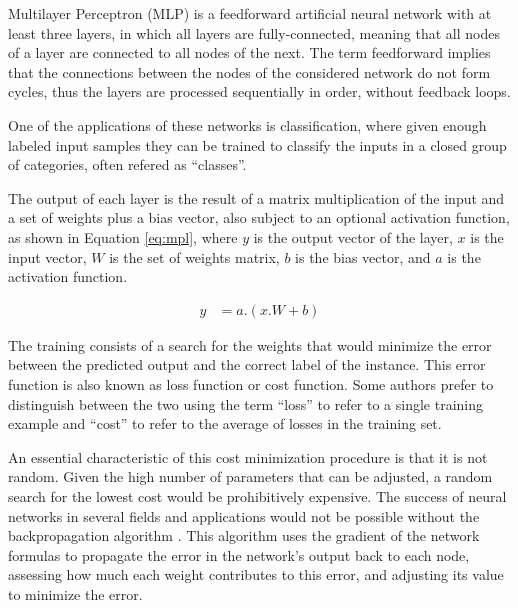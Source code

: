 Multilayer Perceptron (MLP) \cite{rosenblatt_perceptron:_1958} is a feedforward artificial neural network with at least three layers, in which all layers are fully-connected, meaning that all nodes of a layer are connected to all nodes of the next. The term feedforward implies that the connections between the nodes of the considered network do not form cycles, thus the layers are processed sequentially in order, without feedback loops.

One of the applications of these networks is classification, where given enough labeled input samples they can be trained to classify the inputs in a closed group of categories, often refered as ``classes''.

The output of each layer is the result of a matrix multiplication of the input and a set of weights plus a bias vector, also subject to an optional activation function, as shown in Equation \ref{eq:mpl}, where $y$ is the output vector of the layer, $x$ is the input vector, $W$ is the set of weights matrix, $b$ is the bias vector, and $a$ is the activation function.

\begin{align}
\label{eq:mpl}     
y &= a.(x.W + b)
\end{align}

The training consists of a search for the weights that would minimize the error between the predicted output and the correct label of the instance. This error function is also known as loss function or cost function. Some authors prefer to distinguish between the two using the term ``loss'' to refer to a single training example and ``cost'' to refer to the average of losses in the training set.


An essential characteristic of this cost minimization procedure is that it is not random. Given the high number of parameters that can be adjusted, a random search for the lowest cost would be prohibitively expensive.
The success of neural networks in several fields and applications would not be possible without the backpropagation algorithm \cite{rumelhart_general_1986}. 
This algorithm uses the gradient of the network formulas to propagate the error in the network's output back to each node, assessing how much each weight contributes to this error, and adjusting its value to minimize the error.

